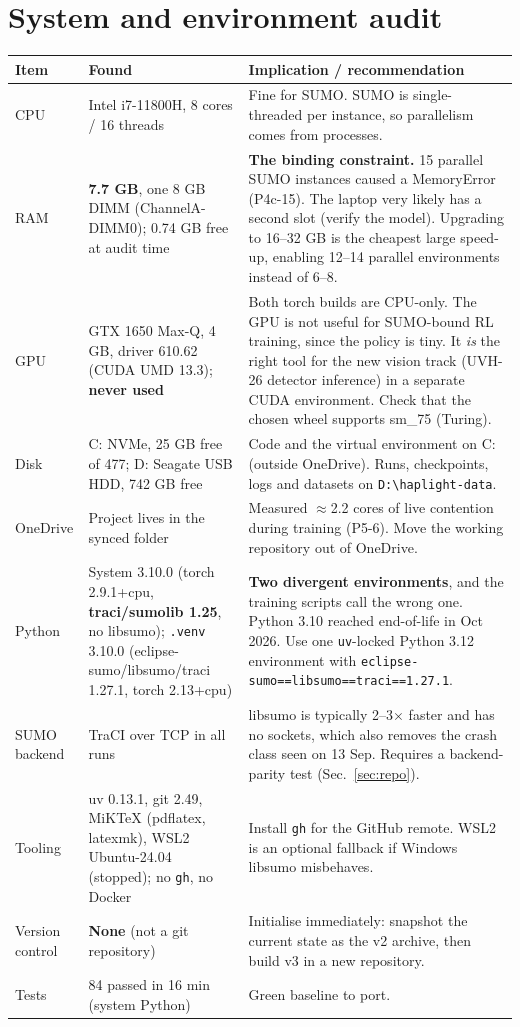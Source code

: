 \documentclass[11pt,a4paper]{article}
\begin{document}
\section{System and environment audit}
\label{sec:system}
\small
\begin{tabularx}{\textwidth}{@{}lXX@{}}
\toprule
Item & Found & Implication / recommendation \\
\midrule
CPU & Intel i7-11800H, 8 cores / 16 threads & Fine for SUMO. SUMO is single-threaded per
  instance, so parallelism comes from processes. \\
RAM & \textbf{7.7 GB}, one 8 GB DIMM (ChannelA-DIMM0); 0.74 GB free at audit time &
  \textbf{The binding constraint.} 15 parallel SUMO instances caused a MemoryError (P4c-15).
  The laptop very likely has a second slot (verify the model). Upgrading to 16--32 GB is the
  cheapest large speed-up, enabling 12--14 parallel environments instead of 6--8. \\
GPU & GTX 1650 Max-Q, 4 GB, driver 610.62 (CUDA UMD 13.3); \textbf{never used} &
  Both torch builds are CPU-only. The GPU is not useful for SUMO-bound RL training, since the
  policy is tiny. It \emph{is} the right tool for the new vision track (UVH-26 detector
  inference) in a separate CUDA environment. Check that the chosen wheel supports
  sm\_75 (Turing). \\
Disk & C: NVMe, 25 GB free of 477; D: Seagate USB HDD, 742 GB free & Code and the virtual
  environment on C: (outside OneDrive). Runs, checkpoints, logs and datasets on
  \texttt{D:\textbackslash haplight-data}. \\
OneDrive & Project lives in the synced folder & Measured $\approx$2.2 cores of live
  contention during training (P5-6). Move the working repository out of OneDrive. \\
Python & System 3.10.0 (torch 2.9.1+cpu, \textbf{traci/sumolib 1.25}, no libsumo);
  \texttt{.venv} 3.10.0 (eclipse-sumo/libsumo/traci 1.27.1, torch 2.13+cpu) &
  \textbf{Two divergent environments}, and the training scripts call the wrong one. Python
  3.10 reached end-of-life in Oct 2026. Use one \texttt{uv}-locked Python 3.12 environment
  with \texttt{eclipse-sumo==libsumo==traci==1.27.1}. \\
SUMO backend & TraCI over TCP in all runs & libsumo is typically 2--3$\times$ faster and has
  no sockets, which also removes the crash class seen on 13 Sep. Requires a backend-parity
  test (Sec.~\ref{sec:repo}). \\
Tooling & uv 0.13.1, git 2.49, MiKTeX (pdflatex, latexmk), WSL2 Ubuntu-24.04 (stopped);
  no \texttt{gh}, no Docker & Install \texttt{gh} for the GitHub remote. WSL2 is an optional
  fallback if Windows libsumo misbehaves. \\
Version control & \textbf{None} (not a git repository) & Initialise immediately: snapshot
  the current state as the v2 archive, then build v3 in a new repository. \\
Tests & 84 passed in 16 min (system Python) & Green baseline to port. \\
\bottomrule
\end{tabularx}
\normalsize
\end{document}
